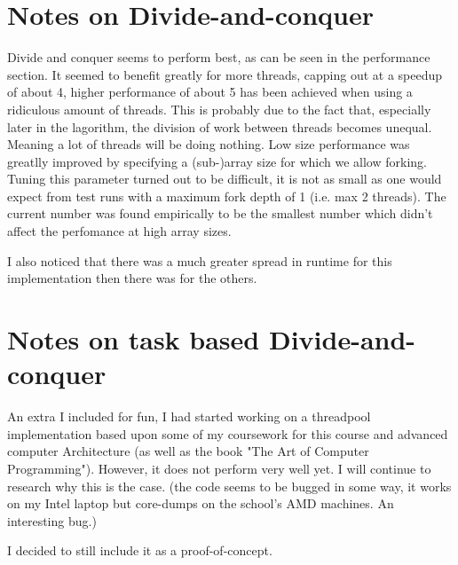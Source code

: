 

\section{Notes on Divide-and-conquer}
  Divide and conquer seems to perform best, as can be seen in the performance section. It seemed to benefit greatly for more threads, capping out
  at a speedup of about 4, higher performance of about 5 has been achieved when using a ridiculous amount of threads. This is probably due to the fact that, especially later in the lagorithm,
  the division of work between threads becomes unequal. Meaning a lot of threads will be doing nothing. Low size performance was greatlly improved by specifying a (sub-)array size for which we allow forking.
  Tuning this parameter turned out to be difficult, it is not as small as one would expect from test runs with a maximum fork depth of 1 (i.e. max 2 threads). The current number was found empirically to be the smallest number
  which didn't affect the perfomance at high array sizes.
  \par I also noticed that there was a much greater spread in runtime for this implementation then there was for the others.
\section{Notes on task based Divide-and-conquer}
  An extra I included for fun, I had started working on a threadpool implementation based upon some of my coursework for this course and advanced computer Architecture (as well as the book "The Art of Computer Programming").
  However, it does not perform very well yet. I will continue to research why this is the case. (the code seems to be bugged in some way, it works on my Intel laptop but core-dumps on the school's AMD machines. An interesting bug.)
  \par I decided to still include it as a proof-of-concept.

